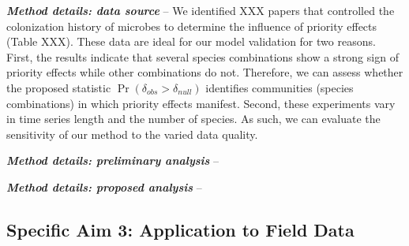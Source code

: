 \documentclass[12pt, class=article, crop=false]{standalone}
\begin{document}
\textit{\textbf{Method details: data source}} --
We identified XXX papers that controlled the colonization history of microbes to determine the influence of priority effects (Table XXX).
These data are ideal for our model validation for two reasons. First, the results indicate that several species combinations show a strong sign of priority effects while other combinations do not.
Therefore, we can assess whether the proposed statistic $\Pr(\delta_{obs} > \delta_{null})$ identifies communities (species combinations) in which priority effects manifest.
Second, these experiments vary in time series length and the number of species.
As such, we can evaluate the sensitivity of our method to the varied data quality.

\textit{\textbf{Method details: preliminary analysis}} --

\textit{\textbf{Method details: proposed analysis}} --

\subsection*{Specific Aim 3: Application to Field Data}
\end{document}
